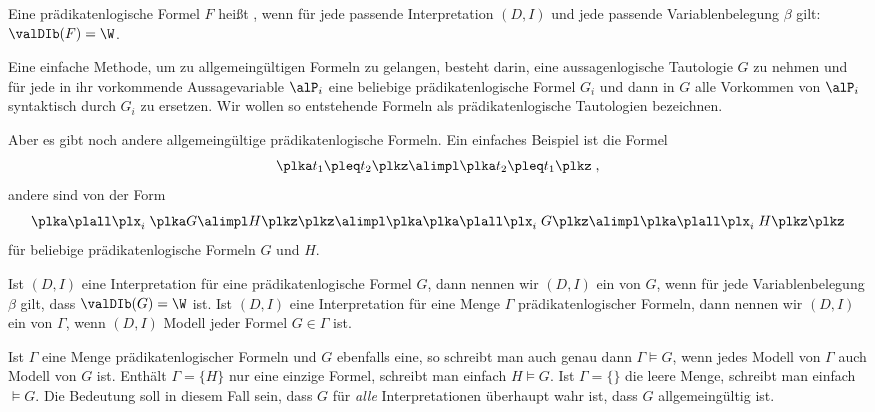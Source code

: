 Eine prädikatenlogische Formel $F$ heißt
, wenn für jede
passende Interpretation $(D,I)$ und jede passende Variablenbelegung
$\beta$ gilt: $\valDIb(F)=\W$.

Eine einfache Methode, um zu allgemeingültigen Formeln zu gelangen,
besteht darin, eine aussagenlogische Tautologie $G$ zu nehmen und für
jede in ihr vorkommende Aussagevariable $\alP_i$ eine beliebige
prädikatenlogische Formel $G_i$ und dann in $G$ alle Vorkommen von
$\alP_i$ syntaktisch durch $G_i$ zu ersetzen.
%
Wir wollen so entstehende Formeln als prädikatenlogische Tautologien
bezeichnen.

Aber es gibt noch andere allgemeingültige prädikatenlogische Formeln.
%
Ein einfaches Beispiel ist die Formel
\[
  \plka t_1\pleq t_2\plkz \alimpl \plka t_2 \pleq t_1 \plkz \;,
\]
%
andere sind \zB von der Form
%
\[
  \plka\plall\plx_i\;\plka G\alimpl H\plkz\plkz \alimpl \plka
  \plka\plall\plx_i \; G\plkz \alimpl \plka\plall\plx_i \; H\plkz
  \plkz
\]
%
für beliebige prädikatenlogische Formeln $G$ und $H$.

Ist $(D,I)$ eine Interpretation für eine prädikatenlogische Formel
$G$, dann nennen wir $(D,I)$ ein  von $G$,
wenn für jede Variablenbelegung $\beta$ gilt, dass $\valDIb(G)=\W$ ist.
%
Ist $(D,I)$ eine Interpretation für eine Menge $\Gamma$
prädikatenlogischer Formeln, dann nennen wir $(D,I)$ ein
 von $\Gamma$, wenn $(D,I)$
Modell jeder Formel $G\in \Gamma$ ist.

Ist $\Gamma$ eine Menge prädikatenlogischer Formeln und $G$ ebenfalls
eine, so schreibt man auch genau dann $\Gamma\models G$, wenn jedes
Modell von $\Gamma$ auch Modell von $G$ ist.
%
Enthält $\Gamma=\{H\}$
nur eine einzige Formel, schreibt man einfach $H\models G$.
%
Ist $\Gamma=\{\}$ die leere Menge, schreibt man einfach $\models G$.
%
Die Bedeutung soll in diesem Fall sein, dass $G$ für \emph{alle}
Interpretationen überhaupt wahr ist, \dh dass $G$ allgemeingültig ist.

